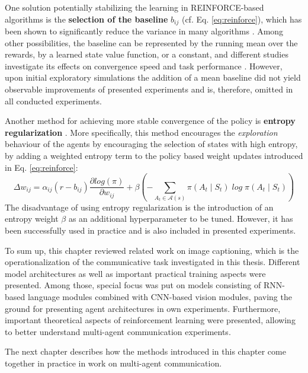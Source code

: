 One solution potentially stabilizing the learning in REINFORCE-based algorithms is the \textbf{selection of the baseline} $b_{ij}$ (cf. Eq. \ref{eq:reinforce}), which has been shown to significantly reduce the variance in many algorithms \parencite{sutton2018reinforcement}. 
Among other possibilities, the baseline can be represented by the running mean over the rewards, by a learned state value function, or a constant, and different studies investigate its effects on convergence speed and task performance \parencite{williams1992simple, greensmith2004variance}. However, upon initial exploratory simulations the addition of a mean baseline did not yield observable improvements of presented experiments and is, therefore, omitted in all conducted experiments. 

Another method for achieving more stable convergence of the policy is \textbf{entropy regularization} \parencite{williams1991function, mnih2016asynchronous}. More specifically, this method encourages the \textit{exploration} behaviour of the agents by encouraging the selection of states with high entropy, by adding a weighted entropy term to the policy based weight updates introduced in Eq. \ref{eq:reinforce}: 
\begin{equation}
\Delta w_{ij} = \alpha_{ij} (r - b_{ij}) \frac{\partial log(\pi)}{\partial w_{ij}} + \beta (- \sum_{A_t \in \mathcal{A}(s)} \pi(A_t \mid S_t) \; log \; \pi(A_t \mid S_t))
\end{equation}
The disadvantage of using entropy regularization is the introduction of an entropy weight $\beta$ as an additional hyperparameter to be tuned. However, it has been successfully used in practice and is also included in presented experiments.

To sum up, this chapter reviewed related work on image captioning, which is the operationalization of the communicative task investigated in this thesis. Different model architectures as well as important practical training aspects were presented. Among those, special focus was put on models consisting of RNN-based language modules combined with CNN-based vision modules, paving the ground for presenting agent architectures in own experiments.  
Furthermore, important theoretical aspects of reinforcement learning were presented, allowing to better understand multi-agent communication experiments. 

The next chapter describes how the methods introduced in this chapter come together in practice in work on multi-agent communication.

